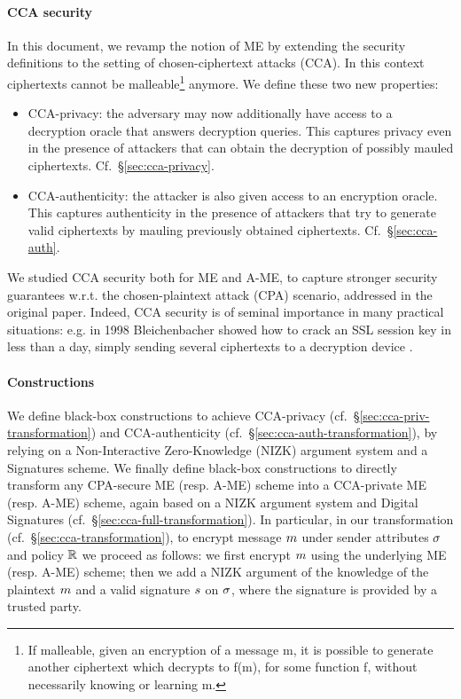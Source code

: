 \paragraph{CCA security}
In this document, we revamp the notion of ME by extending the security definitions to the setting of chosen-ciphertext attacks (CCA).
In this context ciphertexts cannot be malleable\footnote{If malleable, given an encryption of a message m, it is possible to generate another ciphertext which decrypts to f(m), for some function f, without necessarily knowing or learning m.} anymore.
\newline\newline
We define these two new properties:
\begin{itemize}
    \item CCA-privacy: the adversary may now additionally have access to a decryption oracle that answers decryption queries. This captures privacy even in the presence of attackers that can obtain the decryption of possibly mauled ciphertexts. Cf.\ \S\ref{sec:cca-privacy}.
    \item CCA-authenticity: the attacker is also given access to an encryption oracle. This captures authenticity in the presence of attackers that try to generate valid ciphertexts by mauling previously obtained ciphertexts. Cf.\ \S\ref{sec:cca-auth}.
\end{itemize}
We studied CCA security both for ME and A-ME, to capture stronger security guarantees w.r.t. the chosen-plaintext attack (CPA) scenario, addressed in the original paper.
Indeed, CCA security is of seminal importance in many practical situations: e.g. in 1998 Bleichenbacher showed how to crack an SSL session key in less than a day, simply sending several ciphertexts to a decryption device \cite{Bleichenbacher}.

\paragraph{Constructions}
We define black-box constructions to achieve CCA-privacy (cf.\ \S\ref{sec:cca-priv-transformation}) and CCA-authenticity (cf.\ \S\ref{sec:cca-auth-transformation}), by relying on a Non-Interactive Zero-Knowledge (NIZK) argument system and a Signatures scheme.
We finally define black-box constructions to directly transform any CPA-secure ME (resp. A-ME) scheme into a CCA-private ME (resp. A-ME) scheme, again based on a NIZK argument system and Digital Signatures (cf.\ \S\ref{sec:cca-full-transformation}).
\newline\newline
In particular, in our transformation (cf.\ \S\ref{sec:cca-transformation}), to encrypt message $m$ under sender attributes $\sigma$ and policy $\mathbb{R}$ we proceed as follows: we first encrypt $m$ using the underlying ME (resp. A-ME) scheme; then we add a NIZK argument of the knowledge of the plaintext $m$ and a valid signature $s$ on $\sigma$, where the signature is provided by a trusted party.